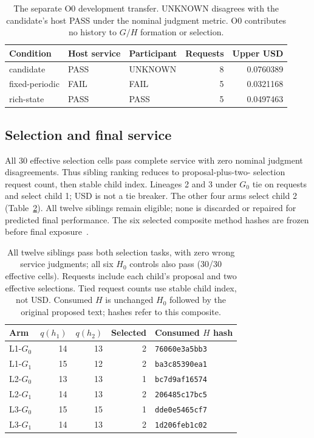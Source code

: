 \begin{table}[htbp]
\centering
\small
\begin{tabular}{lllrr}
\toprule
Condition & Host service & Participant & Requests & Upper USD \\
\midrule
candidate & PASS & UNKNOWN & 8 & 0.0760389 \\
fixed-periodic & FAIL & FAIL & 5 & 0.0321168 \\
rich-state & PASS & PASS & 5 & 0.0497463 \\
\bottomrule
\end{tabular}
\caption{The separate O0 development transfer. UNKNOWN disagrees with the candidate's host PASS under the nominal judgment metric. O0 contributes no history to $G/H$ formation or selection.}
\label{tab:O0}
\end{table}

\subsection{Selection and final service}

All 30 effective selection cells pass complete service with zero nominal
judgment disagreements. Thus sibling ranking reduces to proposal-plus-two-
selection request count, then stable child index. Lineages 2 and 3 under
$G_0$ tie on requests and select child 1; USD is not a tie breaker. The other
four arms select child 2 (Table~\ref{tab:selection}). All twelve siblings
remain eligible; none is discarded or repaired for predicted final
performance. The six selected composite method hashes are frozen before
final exposure~\cite{selection,preservation}.

\begin{table}[htbp]
\centering
\small
\begin{tabular}{lrrrl}
\toprule
Arm & $q(h_1)$ & $q(h_2)$ & Selected & Consumed $H$ hash \\
\midrule
L1-$G_0$ & 14 & 13 & 2 & \texttt{76060e3a5bb3} \\
L1-$G_1$ & 15 & 12 & 2 & \texttt{ba3c85390ea1} \\
L2-$G_0$ & 13 & 13 & 1 & \texttt{bc7d9af16574} \\
L2-$G_1$ & 14 & 13 & 2 & \texttt{206485c17bc5} \\
L3-$G_0$ & 15 & 15 & 1 & \texttt{dde0e5465cf7} \\
L3-$G_1$ & 14 & 13 & 2 & \texttt{1d206feb1c02} \\
\bottomrule
\end{tabular}
\caption{All twelve siblings pass both selection tasks, with zero wrong service judgments; all six $H_0$ controls also pass (30/30 effective cells). Requests include each child's proposal and two effective selections. Tied request counts use stable child index, not USD. Consumed $H$ is unchanged $H_0$ followed by the original proposed text; hashes refer to this composite.}
\label{tab:selection}
\end{table}

